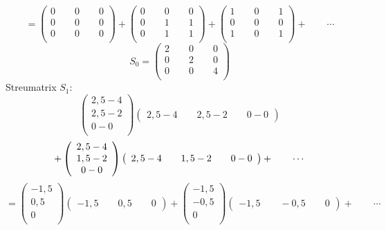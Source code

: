 \[
= 
\left(
\begin {array} {c}
0 \qquad 0 \qquad 0 \\
0 \qquad 0 \qquad 0  \\
0 \qquad 0 \qquad 0  \\
\end {array}
\right)
+
\left(
\begin {array} {c}
0 \qquad 0 \qquad 0  \\
0 \qquad 1 \qquad 1  \\
0 \qquad 1 \qquad 1  \\
\end {array}
\right)
+
\left(
\begin {array} {c}
1 \qquad 0 \qquad 1  \\
0 \qquad 0 \qquad 0  \\
1 \qquad 0 \qquad 1  \\
\end {array}
\right)
+ \qquad \cdots
\]
\[
S_0 =
\left(
\begin {array} {c}
2 \qquad 0 \qquad 0  \\
0 \qquad 2 \qquad 0  \\
0 \qquad 0 \qquad 4  \\
\end {array}
\right)
\]
Streumatrix $S_1$: 
\[
\left(
\begin {array} {c}
2,5 - 4 \\
2,5 - 2 \\
0 - 0 \\
\end {array}
\right)
\left(
\begin {array} {c}
2,5 - 4 \qquad 2,5 - 2 \qquad 0 - 0 
\end {array}
\right)
\]
\[ 
+
\left(
\begin {array} {c}
2,5 - 4 \\
1,5 - 2 \\
0 - 0 \\
\end {array}
\right)
\left(
\begin {array} {c}
2,5 - 4 \qquad 1,5 - 2 \qquad 0 - 0 
\end {array}
\right)
+ \qquad \cdots \\ 
\]
\[
= 
\left(
\begin {array} {c}
-1,5 \\
0,5 \\
0 \\
\end {array}
\right)
\left(
\begin {array} {c}
-1,5 \qquad 0,5 \qquad 0 
\end {array}
\right)
+
\left(
\begin {array} {c}
-1,5 \\
-0,5 \\
0 \\
\end {array}
\right)
\left(
\begin {array} {c}
-1,5 \qquad -0,5 \qquad 0 
\end {array}
\right) 
+ \qquad \cdots
\]
